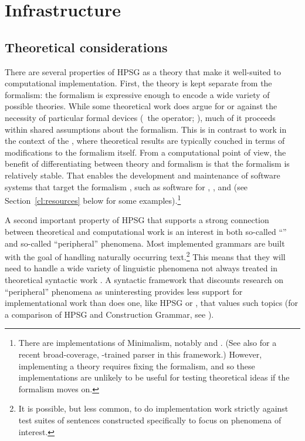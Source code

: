 \documentclass[output=paper
	        ,collection
	        ,collectionchapter
 	        ,biblatex
                ,babelshorthands
                ,newtxmath
                ,draftmode
                ,colorlinks, citecolor=brown
]{langscibook}
\begin{document}
\section{Infrastructure}
\label{cl:infrastructure}

\subsection{Theoretical considerations}
\label{cl:theoretical}

There are several properties of HPSG as a theory that make it well-suited to computational implementation.
First, the theory is kept separate from the formalism:
the formalism is expressive enough to encode a wide variety of possible theories.
While some theoretical work does argue for or against the necessity of particular formal devices
(\eg\ the  operator; \citealt{Reape94a}),
much of it proceeds within shared assumptions about the formalism.
This is in contrast to work in the context of the  \citep{Chomsky95a-u},
where theoretical results are typically couched in terms of modifications to the formalism itself.
From a computational point of view, the benefit of differentiating between theory and formalism
is that the formalism is relatively stable.
That enables the development and maintenance of software systems that target the formalism \citep{boguraev1988software},
such as software for , , and 
(see Section~\ref{cl:resources} below for some examples).\footnote{%
	There are implementations of Minimalism, notably \citet{Stabler97a-u} and \citet{Herring:16}. (See also \citealt{Tor:Sta:Ste:19} for a recent broad-coverage, -trained parser in this framework.)
	However, implementing a theory requires fixing the formalism,
	and so these implementations are unlikely to be useful for testing theoretical ideas
	if the formalism moves on.
}

A second important property of HPSG that supports a strong connection between theoretical and computational work is an interest in both so-called ``'' and so-called ``peripheral'' phenomena. Most implemented grammars are built with the goal of handling naturally occurring text.\footnote{It is possible, but less common, to do implementation work strictly against test suites of sentences constructed specifically to focus on phenomena of interest.} This means that they will need to handle a wide variety of linguistic phenomena not always treated in theoretical syntactic work \citep{Baldwin-et-al-05}. A syntactic framework that discounts research on ``peripheral'' phenomena as uninteresting provides less support for implementational work than does one, like HPSG or , that values such topics (for a comparison of HPSG and Construction Grammar, see ).
\end{document}

